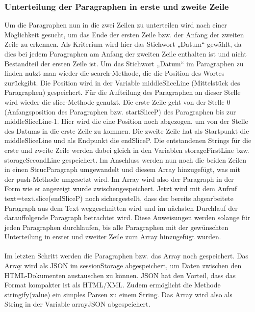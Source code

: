{\subsubsection{Unterteilung der Paragraphen in erste und zweite Zeile}
Um die Paragraphen nun in die zwei Zeilen zu unterteilen wird nach einer Möglichkeit gesucht, um das Ende der ersten Zeile bzw. der Anfang der zweiten Zeile zu erkennen. Als Kriterium wird hier das Stichwort „Datum“ gewählt, da dies bei jedem Paragraphen am Anfang der zweiten Zeile enthalten ist und nicht Bestandteil der ersten Zeile ist. Um das Stichwort „Datum“ im Paragraphen zu finden nutzt man wieder die search-Methode, die die Position des Wortes zurückgibt. Die Position wird in der Variable middleSliceLine (Mittelstück des Paragraphen) gespeichert. Für die Aufteilung des Paragraphen an dieser Stelle wird wieder die slice-Methode genutzt. Die erste Zeile geht von der Stelle 0 (Anfangsposition des Paragraphen bzw. startSliceP) des Paragraphen bis zur middleSliceLine-1. Hier wird die eine Position noch abgezogen, um von der Stelle des Datums in die erste Zeile zu kommen. Die zweite Zeile hat als Startpunkt die middleSliceLine und als Endpunkt die endSliceP. Die entstandenen Strings für die erste und zweite Zeile werden dabei gleich in den Variablen storageFirstLine bzw. storageSecondLine gespeichert. Im Anschluss werden nun noch die beiden Zeilen in einen StrucParagraph umgewandelt und diesem Array hinzugefügt, was mit der push-Methode umgesetzt wird. Im Array wird also der Paragraph in der Form wie er angezeigt wurde zwischengespeichert. Jetzt wird mit dem Aufruf text=text.slice(endSliceP) noch sichergestellt, dass der bereits abgearbeitete Paragraph aus dem Text weggeschnitten wird und im nächsten Durchlauf der darauffolgende Paragraph betrachtet wird.
Diese Anweisungen werden solange für jeden Paragraphen durchlaufen, bis alle Paragraphen mit der gewünschten Unterteilung in erster und zweiter Zeile zum Array hinzugefügt wurden.\\
\\
Im letzten Schritt werden die Paragraphen bzw. das Array noch gespeichert. Das Array wird als \ac{JSON} im sessionStorage abgespeichert, um Daten zwischen den HTML-Dokumenten austauschen zu können. JSON hat den Vorteil, dass das Format kompakter ist als HTML/XML. Zudem ermöglicht die Methode stringify(value) ein simples Parsen zu einem String. Das Array wird also als String in der Variable arrayJSON abgespeichert. 

}
